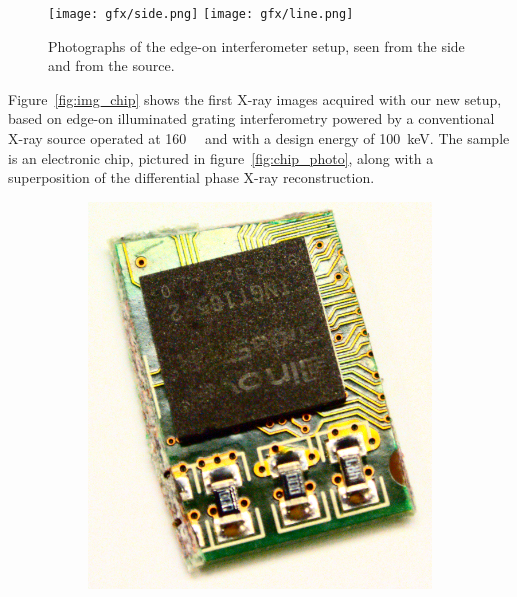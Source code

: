 \begin{figure}[ht]
    \centering
    \texttt{[image: gfx/side.png]}
    \texttt{[image: gfx/line.png]}
    \caption{Photographs of the edge-on interferometer setup, seen
    from the side and from the source.}\label{fig:edge.on.photos}
\end{figure}

Figure~\ref{fig:img_chip} shows the first X-ray images acquired with our new setup, based on
edge-on illuminated grating interferometry powered by a conventional X-ray
source operated at \SI{160}{\kilo\voltpeak} and with a design energy of
\SI{100}{\kilo\eV}. The sample is an electronic chip, pictured in
figure~\ref{fig:chip_photo}, along with a superposition of the differential
phase X-ray reconstruction.

\begin{figure}[htb]
    \centering
    \begin{subfigure}[b]{.49\textwidth}
    \centering
    \includegraphics[width=\textwidth]{gfx/mythen-edge-on/chip_overlay_empy.png}
    \caption{}
    \end{subfigure}
    \begin{subfigure}[b]{.49\textwidth}
    \centering

\end{subfigure}
\end{figure}

